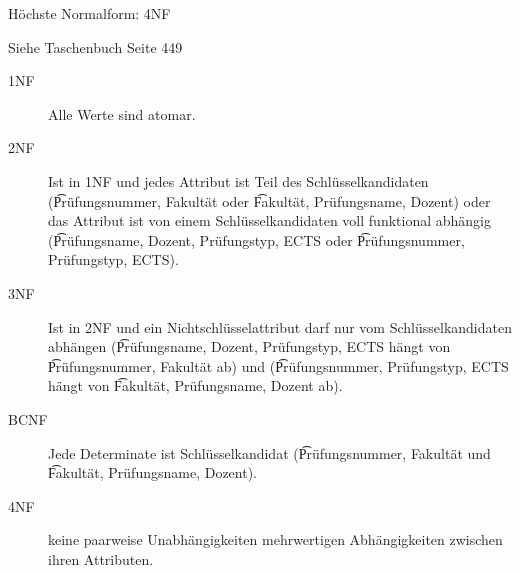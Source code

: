 \documentclass{bschlangaul-aufgabe}
\begin{document}
\begin{bAntwort}

Höchste Normalform: 4NF

Siehe Taschenbuch Seite 449

\begin{description}
\item[1NF]

Alle Werte sind atomar.

\item[2NF]

Ist in 1NF und jedes Attribut ist Teil des Schlüsselkandidaten
(\t{Prüfungsnummer, Fakultät} oder \t{Fakultät, Prüfungsname, Dozent})
oder das Attribut ist von einem Schlüsselkandidaten voll funktional
abhängig (\t{Prüfungsname, Dozent, Prüfungstyp, ECTS} oder
\t{Prüfungsnummer, Prüfungstyp, ECTS}).

\item[3NF]

Ist in 2NF und ein Nichtschlüsselattribut darf nur vom
Schlüsselkandidaten abhängen (\t{Prüfungsname, Dozent, Prüfungstyp,
ECTS} hängt von \t{Prüfungsnummer, Fakultät} ab) und (\t{Prüfungsnummer,
Prüfungstyp, ECTS} hängt von \t{Fakultät, Prüfungsname, Dozent} ab).

\item[BCNF]

Jede Determinate ist Schlüsselkandidat (\t{Prüfungsnummer, Fakultät} und
\t{Fakultät, Prüfungsname, Dozent}).

\item[4NF]

keine paarweise Unabhängigkeiten mehrwertigen Abhängigkeiten zwischen
ihren Attributen.
\end{description}
\end{bAntwort}
\end{document}
